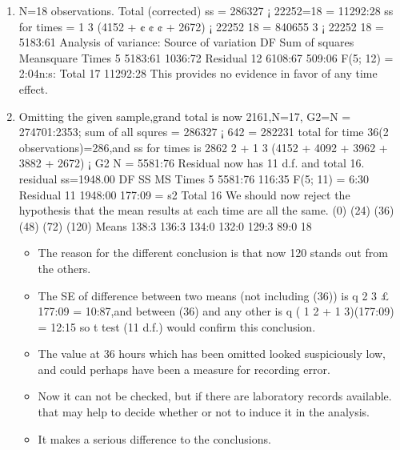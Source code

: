 \documentclass[a4paper,12pt]{article}
\begin{document}
\begin{enumerate}
\item N=18 observations. Total (corrected) ss = 286327 ¡ 22252=18 = 11292:28
ss for times =
1
3
(4152 + ¢ ¢ ¢ + 2672) ¡
22252
18
=
840655
3
¡
22252
18
= 5183:61
Analysis of variance:
Source of variation DF Sum of squares Meansquare
Times 5 5183:61 1036:72
Residual 12 6108:67 509:06 F(5; 12) = 2:04n:s:
Total 17 11292:28
This provides no evidence in favor of any time effect.
\item Omitting the given sample,grand total is now 2161,N=17, G2=N = 274701:2353;
sum of all squres = 286327 ¡ 642 = 282231 total for time 36(2 observations)=286,and
ss for times is
2862
2
+
1
3
(4152 + 4092 + 3962 + 3882 + 2672) ¡
G2
N
= 5581:76
Residual now has 11 d.f. and total 16. residual ss=1948.00
DF SS MS
Times 5 5581:76 116:35 F(5; 11) = 6:30
Residual 11 1948:00 177:09 = s2
Total 16
We should now reject the hypothesis that the mean results at each time are all the same.
(0) (24) (36) (48) (72) (120)
Means 138:3 136:3 134:0 132:0 129:3 89:0
18
\begin{itemize}
    \item The reason for the different conclusion is that now 120 stands out from the others.
\item The SE of difference between two means (not including (36)) is
q
2
3 £ 177:09 = 10:87,and
between (36) and any other is
q
( 1
2 + 1
3)(177:09) = 12:15 so t test (11 d.f.) would confirm
this conclusion.
\item The value at 36 hours which has been omitted looked suspiciously low, and could perhaps
have been a measure for recording error. 
\item Now it can not be checked, but if there
are laboratory records available. that may help to decide whether or not to induce it in
the analysis. 
\item It makes a serious difference to the conclusions.
\end{itemize}


\end{enumerate}
\end{document}
